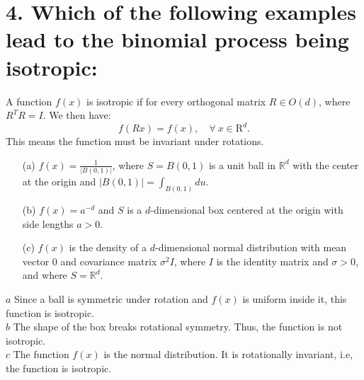 \documentclass{article}
\begin{document}
\section*{4. Which of the following examples lead to the binomial process being isotropic:}
A function $f(x)$ is isotropic if for every orthogonal matrix $R \in O(d)$, where $R^T R=I$. We then have:
\[ 
f(Rx)=f(x), \quad \forall\  x\in \mathrm{R}^d.
\]
This means the function must be invariant under rotations.
\begin{enumerate}
    \item[(a)] $f(x) = \frac{1}{|B(0, 1)|}$, where $S = B(0, 1)$ is a unit ball in $\mathbb{R}^d$ with the center at the origin and $|B(0, 1)| = \int_{B(0,1)} du$. 
    
    \item[(b)] $f(x) = a^{-d}$ and $S$ is a $d$-dimensional box centered at the origin with side lengths $a > 0$.
    
    \item[(c)] $f(x)$ is the density of a $d$-dimensional normal distribution with mean vector 0 and covariance matrix $\sigma^2 I$, where $I$ is the identity matrix and $\sigma > 0$, and where $S = \mathbb{R}^d$.
\end{enumerate}
\(a\) Since a ball is symmetric under rotation and $f(x)$ is uniform inside it, this function is isotropic.\\
\(b\) The shape of the box breaks rotational symmetry. Thus, the function is not isotropic.\\
\(c\) The function $f(x)$ is the normal distribution. It is rotationally invariant, i.e, the function is isotropic.
\end{document}
